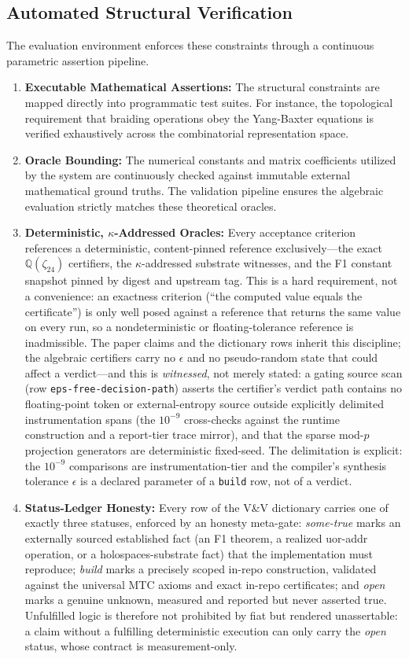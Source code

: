 \subsection{Automated Structural Verification}
The evaluation environment enforces these constraints through a continuous parametric assertion pipeline. 
\begin{enumerate}
    \item \textbf{Executable Mathematical Assertions:} The structural constraints are mapped directly into programmatic test suites. For instance, the topological requirement that braiding operations obey the Yang-Baxter equations is verified exhaustively across the combinatorial representation space.
    \item \textbf{Oracle Bounding:} The numerical constants and matrix coefficients utilized by the system are continuously checked against immutable external mathematical ground truths. The validation pipeline ensures the algebraic evaluation strictly matches these theoretical oracles.
    \item \textbf{Deterministic, $\kappa$-Addressed Oracles:} Every acceptance criterion references a deterministic, content-pinned reference exclusively---the exact $\mathbb{Q}(\zeta_{24})$ certifiers, the $\kappa$-addressed substrate witnesses, and the F1 constant snapshot pinned by digest and upstream tag. This is a hard requirement, not a convenience: an exactness criterion (``the computed value equals the certificate'') is only well posed against a reference that returns the same value on every run, so a nondeterministic or floating-tolerance reference is inadmissible. The paper claims and the dictionary rows inherit this discipline; the algebraic certifiers carry no $\epsilon$ and no pseudo-random state that could affect a verdict---and this is \emph{witnessed}, not merely stated: a gating source scan (row \texttt{eps-free-decision-path}) asserts the certifier's verdict path contains no floating-point token or external-entropy source outside explicitly delimited instrumentation spans (the $10^{-9}$ cross-checks against the runtime construction and a report-tier trace mirror), and that the sparse mod-$p$ projection generators are deterministic fixed-seed. The delimitation is explicit: the $10^{-9}$ comparisons are instrumentation-tier and the compiler's synthesis tolerance $\epsilon$ is a declared parameter of a \texttt{build} row, not of a verdict.
    \item \textbf{Status-Ledger Honesty:} Every row of the V\&V dictionary carries one of exactly three statuses, enforced by an honesty meta-gate: \textit{some-true} marks an externally sourced established fact (an F1 theorem, a realized uor-addr operation, or a holospaces-substrate fact) that the implementation must reproduce; \textit{build} marks a precisely scoped in-repo construction, validated against the universal MTC axioms and exact in-repo certificates; and \textit{open} marks a genuine unknown, measured and reported but never asserted true. Unfulfilled logic is therefore not prohibited by fiat but rendered unassertable: a claim without a fulfilling deterministic execution can only carry the \textit{open} status, whose contract is measurement-only.
\end{enumerate}

